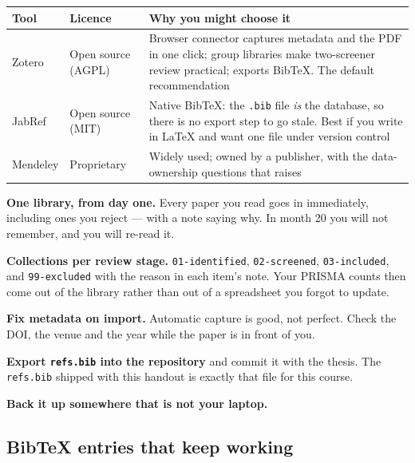 \begin{center}
\small
\begin{tabular}{@{}L{2.4cm}L{3.0cm}L{9.0cm}@{}}
\toprule
\textbf{Tool} & \textbf{Licence} & \textbf{Why you might choose it} \\
\midrule
Zotero   & Open source (AGPL)
         & Browser connector captures metadata and the PDF in one click; group
           libraries make two-screener review practical; exports BibTeX.
           The default recommendation \\
JabRef   & Open source (MIT)
         & Native BibTeX: the \texttt{.bib} file \emph{is} the database, so
           there is no export step to go stale. Best if you write in \LaTeX{}
           and want one file under version control \\
Mendeley & Proprietary
         & Widely used; owned by a publisher, with the data-ownership questions
           that raises \\
\bottomrule
\end{tabular}
\end{center}

\begin{conceptbox}
\begin{tightnum}
  \item \textbf{One library, from day one.} Every paper you read goes in
    immediately, including ones you reject --- with a note saying why. In month
    20 you will not remember, and you will re-read it.
  \item \textbf{Collections per review stage.} \texttt{01-identified},
    \texttt{02-screened}, \texttt{03-included}, and \texttt{99-excluded} with
    the reason in each item's note. Your PRISMA counts then come out of the
    library rather than out of a spreadsheet you forgot to update.
  \item \textbf{Fix metadata on import.} Automatic capture is good, not
    perfect. Check the DOI, the venue and the year while the paper is in front
    of you.
  \item \textbf{Export \texttt{refs.bib} into the repository} and commit it
    with the thesis. The \texttt{refs.bib} shipped with this handout is exactly
    that file for this course.
  \item \textbf{Back it up somewhere that is not your laptop.}
\end{tightnum}
\end{conceptbox}

\subsection{BibTeX entries that keep working}

